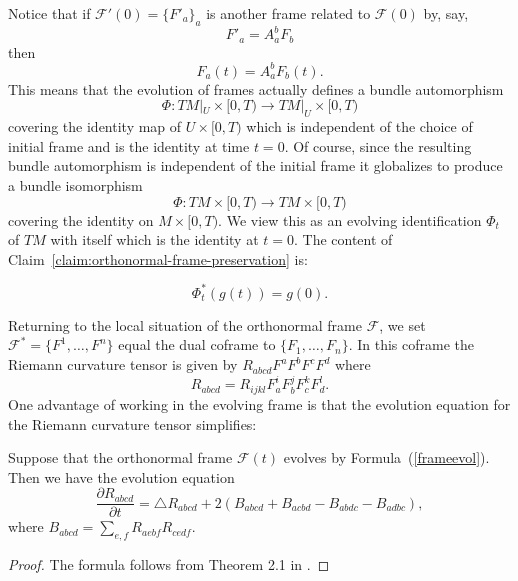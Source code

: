 Notice that if ${\mathcal F}'(0)=\{F'_a\}_a$ is another
frame related to ${\mathcal F}(0)$ by, say,
$$F'_a=A^b_aF_b$$
then $$F_a(t)=A^b_aF_b(t).$$ This means that the evolution of frames
actually defines a bundle automorphism
$$\Phi\colon TM|_U\times [0,T)\to TM|_U\times [0,T)$$
covering the identity map of $U\times[0,T)$ which is independent of
the choice of initial frame and is the identity at time $t=0$. Of
course, since the resulting bundle automorphism is independent of
the initial frame it globalizes to produce a bundle isomorphism
$$\Phi\colon TM\times[0,T)\to TM\times [0,T)$$
covering the identity on $M\times [0,T)$. We view this as an
evolving identification $\Phi_t$ of $TM$ with itself which is the
identity at $t=0$. The content of Claim~\ref{claim:orthonormal-frame-preservation} is:

\begin{corollary}\label{cor:pullback-metric-constant}


$$\Phi_t^*(g(t))=g(0).$$
\end{corollary}

Returning to the local situation of the orthonormal frame ${\mathcal
F}$, we set ${\mathcal F}^*=\{F^1,\ldots, F^n\}$ equal the dual
coframe to $\{F_1,\ldots,F_n\}$. In this coframe the Riemann
curvature tensor is given by $R_{abcd}F^aF^bF^cF^d$ where
\begin{equation}\label{framecoord} R_{abcd} =
R_{ijkl}F^{i}_{a}F^{j}_{b}F^{k}_{c}F^{l}_{d}.\end{equation} One
advantage of working in the evolving frame is that the evolution
equation for the Riemann curvature tensor simplifies:


\begin{lemma}\label{lem:curvature-evolution-frame}

\label{M}

Suppose that the orthonormal frame ${\mathcal F}(t)$  evolves by
Formula~(\ref{frameevol}). Then we have the evolution equation
$$\frac{\partial R_{abcd}}{\partial t} = \triangle R_{abcd} +
2(B_{abcd} +B_{acbd}-B_{abdc}-B_{adbc}),$$ where $B_{abcd} =
\sum_{e,f}R_{aebf}R_{cedf}$.
\end{lemma}


\begin{proof}
\sketch The formula follows from Theorem 2.1 in \cite{Hamiltonharnack}.
\end{proof}

